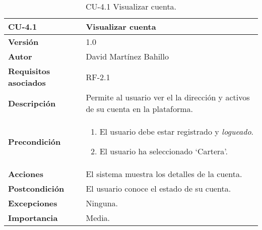 \begin{table}[p]
	\centering
	\begin{tabularx}{\linewidth}{ p{} p{} }
		\toprule
		\textbf{CU-4.1}  & \textbf{Visualizar cuenta}\\
		\midrule
		\textbf{Versión}              & 1.0    \\
		\textbf{Autor}                & David Martínez Bahillo \\
		\textbf{Requisitos asociados} & RF-2.1 \\
		\textbf{Descripción}          & Permite al usuario ver el la dirección y activos de su cuenta en la plataforma. \\
		\textbf{Precondición}         &  
		\begin{enumerate}
			\def\labelenumi{\arabic{enumi}.}
			\tightlist
			\item El usuario debe estar registrado y \textit{logueado}.
			\item El usuario ha seleccionado `Cartera'.
		\end{enumerate}\\
		\textbf{Acciones}             & El sistema muestra los detalles de la cuenta.\\
		\textbf{Postcondición}        & El usuario conoce el estado de su cuenta. \\
		\textbf{Excepciones}          & Ninguna. \\
		\textbf{Importancia}          & Media.  \\
		\bottomrule
	\end{tabularx}
	\caption{CU-4.1 Visualizar cuenta.}
\end{table}


